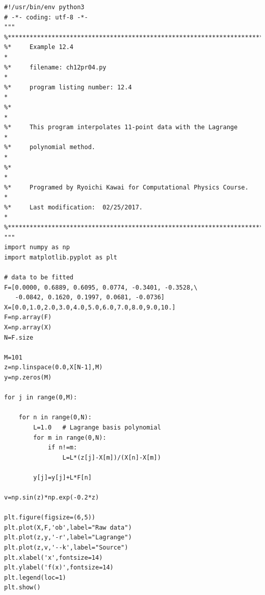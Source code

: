 \bigskip
\noindent
\program
\footnotesize
\begin{verbatim}
#!/usr/bin/env python3
# -*- coding: utf-8 -*-
"""
%**************************************************************************
%*     Example 12.4                                                       *
%*     filename: ch12pr04.py                                              *
%*     program listing number: 12.4                                       *
%*                                                                        *
%*     This program interpolates 11-point data with the Lagrange          *
%*     polynomial method.                                                 *
%*                                                                        *
%*     Programed by Ryoichi Kawai for Computational Physics Course.       *
%*     Last modification:  02/25/2017.                                    *
%**************************************************************************
"""
import numpy as np
import matplotlib.pyplot as plt

# data to be fitted
F=[0.0000, 0.6889, 0.6095, 0.0774, -0.3401, -0.3528,\
   -0.0842, 0.1620, 0.1997, 0.0681, -0.0736]
X=[0.0,1.0,2.0,3.0,4.0,5.0,6.0,7.0,8.0,9.0,10.]
F=np.array(F)
X=np.array(X)
N=F.size

M=101
z=np.linspace(0.0,X[N-1],M)
y=np.zeros(M)

for j in range(0,M):

    for n in range(0,N):
        L=1.0   # Lagrange basis polynomial
        for m in range(0,N):
            if n!=m:
                L=L*(z[j]-X[m])/(X[n]-X[m])

        y[j]=y[j]+L*F[n]

v=np.sin(z)*np.exp(-0.2*z)

plt.figure(figsize=(6,5))
plt.plot(X,F,'ob',label="Raw data")
plt.plot(z,y,'-r',label="Lagrange")
plt.plot(z,v,'--k',label="Source")
plt.xlabel('x',fontsize=14)
plt.ylabel('f(x)',fontsize=14)
plt.legend(loc=1)
plt.show()
\end{verbatim}
\normalsize


